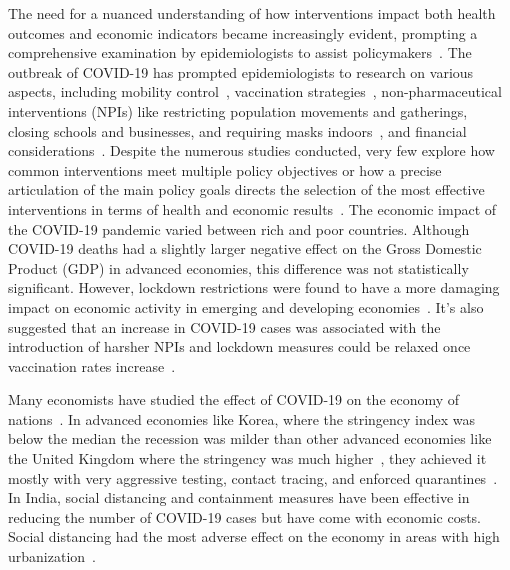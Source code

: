 \documentclass[tikz,fleqn,12pt]{wlscirep}
\begin{document}
The need for a nuanced understanding of how interventions impact both health outcomes and economic indicators became increasingly evident, prompting a comprehensive examination by epidemiologists to assist policymakers~\cite{Anderson2020}. The outbreak of COVID-19 has prompted epidemiologists to research on various aspects, including mobility control~\cite{Song2022,Chinazzi2020}, vaccination strategies~\cite{Nguyen2021, Kim2022}, non-pharmaceutical interventions (NPIs) like restricting population movements and gatherings, closing schools and businesses, and requiring masks indoors~\cite{Jalloh2022,Caldwell2021,Ferguson2020}, and financial considerations~\cite{DeFoo2023}. Despite the numerous studies conducted, very few explore how common interventions meet multiple policy objectives or how a precise articulation of the main policy goals directs the selection of the most effective interventions in terms of health and economic results~\cite{Hollingsworth2011, Song2022,Pangallo2023,Ash2022,Ohi2020, PADMANABHAN2021102676,NBERw26981,analytical_covid_lockdown_model}. The economic impact of the COVID-19 pandemic varied between rich and poor countries. Although COVID-19 deaths had a slightly larger negative effect on the Gross Domestic Product (GDP) in advanced economies, this difference was not statistically significant. However, lockdown restrictions were found to have a more damaging impact on economic activity in emerging and developing economies~\cite{Gagnon2023,Redlin2022,Liang2021}. It's also suggested that an increase in COVID-19 cases was associated with the introduction of harsher NPIs and lockdown measures could be relaxed once vaccination rates increase~\cite{Redlin2022,Patel2021}.

Many economists have studied the effect of COVID-19 on the economy of nations~\cite{Gagnon2023,GagnonKorea,Deb2020,Eichenbaum2021}. In advanced economies like Korea, where the stringency index was below the median the recession was milder than other advanced economies like the United Kingdom where the stringency was much higher~\cite{GagnonKorea}, they achieved it mostly with very aggressive testing, contact tracing, and enforced quarantines~\cite{Lim2023,KoreaMinister}. In India, social distancing and containment measures have been effective in reducing the number of COVID-19 cases but have come with economic costs. Social distancing had the most adverse effect on the economy in areas with high urbanization~\cite{Deb2020}.
\end{document}

